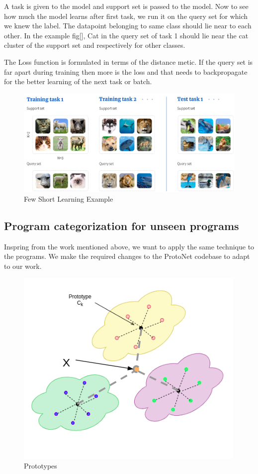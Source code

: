     A task is given to the model and support set is passed to the model. Now to see how much the model learns after first task, we run it on the query set for which we knew the label. The datapoint belonging to same class should lie near to each other. In the example fig[], Cat in the query set of task 1 should lie near the cat cluster of the support set and respectively for other classes.
	
	The Loss function is formulated in terms of the distance metic. If the query set is far apart during training then more is the loss and that needs to backpropagate for the better learning of the next task or batch.

\begin{figure}[t]
    \centering
    \includegraphics[scale=0.4]{figures/chapter-2/unsupervised_few_short.png}
    \caption{Few Short Learning Example}
     \label{fig:unsupervised-fewShort}
\end{figure}

\subsection{Program categorization for unseen programs}
Inspring from the work mentioned above, we want to apply the same technique to the programs. We make the required changes to the ProtoNet codebase to adapt to our work. 

\begin{figure}[t]
    \centering
    \includegraphics[scale=0.5]{figures/chapter-2/prototypes.png}
    \caption{Prototypes}
     \label{fig:unsupervised-prototypes}
\end{figure}


